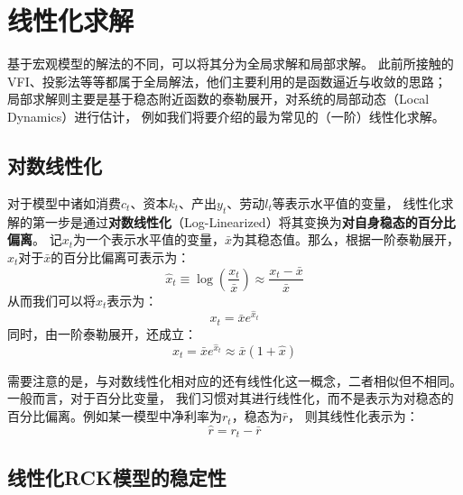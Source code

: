 
\section{线性化求解}    \label{sec-linearization}

基于宏观模型的解法的不同，可以将其分为全局求解和局部求解。
此前所接触的VFI、投影法等等都属于全局解法，他们主要利用的是函数逼近与收敛的思路；
局部求解则主要是基于稳态附近函数的泰勒展开，对系统的局部动态（Local Dynamics）进行估计，
例如我们将要介绍的最为常见的（一阶）线性化求解。


\subsection{对数线性化}

对于模型中诸如消费$c_t$、资本$k_t$、产出$y_t$、劳动$l_t$等表示水平值的变量，
线性化求解的第一步是通过\textbf{对数线性化}（Log-Linearized）将其变换为\textbf{对自身稳态的百分比偏离}。
记$x_t$为一个表示水平值的变量，$\bar{x}$为其稳态值。那么，根据一阶泰勒展开，$x_t$对于$\bar{x}$的百分比偏离可表示为：
\begin{equation*}
    \hat{x}_t \equiv \log \left(\frac{x_t}{\bar{x}}\right) \approx \frac{x_t-\bar{x}}{\bar{x}}
\end{equation*}
从而我们可以将$x_t$表示为：
\begin{equation}
    x_t=\bar{x} e^{\hat{x}_t}
\end{equation}
同时，由一阶泰勒展开，还成立：
\begin{equation}
    x_t = \bar{x} e^{\hat{x}_t} \approx \bar{x}(1+\hat{x})
\end{equation}

需要注意的是，与对数线性化相对应的还有线性化这一概念，二者相似但不相同。一般而言，对于百分比变量，
我们习惯对其进行线性化，而不是表示为对稳态的百分比偏离。例如某一模型中净利率为$r_t$，稳态为$\bar{r}$，
则其线性化表示为：
\begin{equation*}
    \hat{r} = r_t - \bar{r}
\end{equation*}


\subsection{线性化RCK模型的稳定性}

